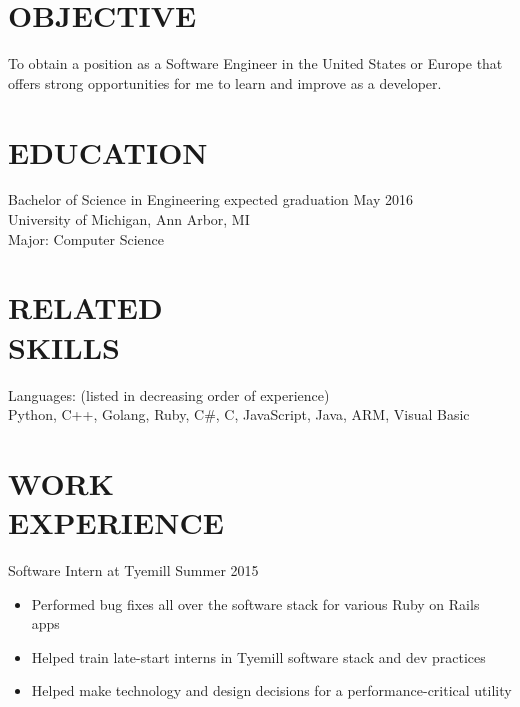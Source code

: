 \documentclass[line,margin]{res}
\begin{document}

\color{HeaderColor}
\address{ajlj@umich.edu -- 248-716-5054}
\address{Citizen of the United States and Italy}
 
 \renewcommand{\labelitemi}{$-$}
 
\begin{resume}
\color{black}
\section{\textcolor{HeaderColor}{OBJECTIVE}}
				To obtain a position as a Software Engineer in the United States or Europe that offers strong opportunities for me to learn and improve as a developer.

\section{\textcolor{HeaderColor}{EDUCATION}} {\sc Bachelor of Science in Engineering} \hfill expected graduation May 2016\\
				University of Michigan, Ann Arbor, MI \\
                Major: Computer Science
 
\section{\textcolor{HeaderColor}{RELATED \\ SKILLS}} 
				{\sc Languages: (listed in decreasing order of experience)} \\
				Python, C++, Golang, Ruby, C\#, C, JavaScript, Java, ARM, Visual Basic \\
 
\section{\textcolor{HeaderColor}{WORK \\ EXPERIENCE}} 
                {\sc Software Intern at Tyemill} \hfill Summer 2015
                 \begin{itemize}  \itemsep -2pt %
                 \item Performed bug fixes all over the software stack for various Ruby on Rails apps
	      \item Helped train late-start interns in Tyemill software stack and dev practices
	      \item Helped make technology and design decisions for a performance-critical utility
                 \end{itemize}


\end{resume}
\end{document}
